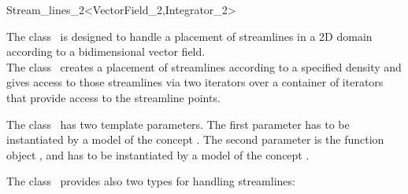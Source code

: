 

\ccModifierCrossRefOff
\begin{ccRefClass}{Stream_lines_2<VectorField_2,Integrator_2>}  %


\ccDefinition
  
The class \ccRefName\ is designed to handle a placement of streamlines
in a 2D domain according to a bidimensional vector field.\\

The class \ccRefName\ creates a placement of streamlines according to
a specified density and gives access to those streamlines via two
iterators over a container of iterators that provide access to the
streamline points.

\ccParameters
The class \ccRefName\ has two template parameters. The first parameter
 has to be instantiated by a model of the concept
. The second parameter is the function object
, and has to be instantiated by a model of the concept
.

\ccTypes
{}
\ccGlue
{}
\ccGlue
{}
\ccGlue
{}

The class \ccRefName\ provides also two types for handling
streamlines:

\ccGlue
{}
\ccGlue




\end{ccRefClass}
